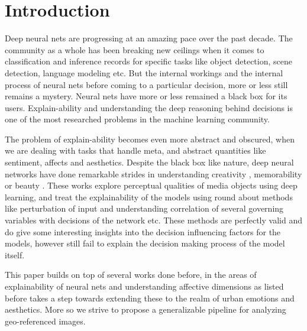 \section{Introduction}

Deep neural nets are progressing at an amazing pace over the past decade. The community as a whole has been breaking new ceilings 
when it comes to classification and inference records for specific tasks like object detection, scene detection, language modeling etc.
But the internal workings and the internal process of neural nets before coming to a particular decision, more or less still remains a mystery.
Neural nets have more or less remained a black box for its users. Explain-ability and understanding the deep reasoning behind decisions is 
one of the most researched problems in the machine learning community.
\par
The problem of explain-ability becomes even more abstract and obscured, when we are dealing with tasks that handle meta, and abstract quantities like
sentiment, affects and aesthetics. Despite the black box like nature, deep neural networks have done remarkable strides in understanding creativity \cite{redi20146}, 
memorability \cite{Isola2011} or beauty \cite{schifanella2015image}. 
These works explore perceptual qualities of media objects using deep learning, and treat the explainability of the models using round about methods like perturbation 
of input and understanding correlation of several governing variables with decisions of the network etc. These methods are perfectly valid and do give some interesting insights into the decision influencing factors for the models, however still fail to explain the decision making process of the model itself.  
\par 
This paper builds on top of several works done before, in the areas of explainability of neural nets and understanding affective dimensions as listed before takes a step
towards extending these to the realm of urban emotions and aesthetics. More so we strive to propose a generalizable pipeline for analyzing geo-referenced
images.